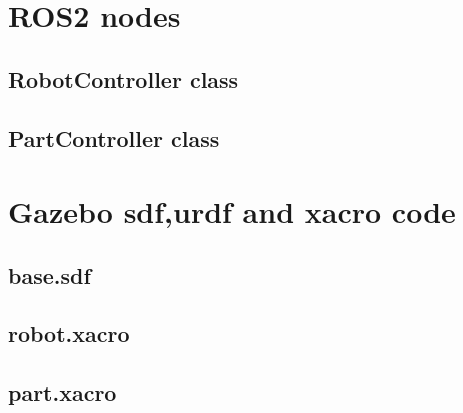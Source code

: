 \newpage
\section{ROS2 nodes}
% 
% 
\subsection{RobotController class}
\label{lst:RobotController}

\newpage
\subsection{PartController class}
\label{lst:PartController}


\newpage
\section{Gazebo sdf,urdf and xacro code}
\subsection{base.sdf}
\label{lst:base}

\subsection{robot.xacro}
\label{lst:robotXacro}

\subsection{part.xacro}
\label{lst:partXacro}

